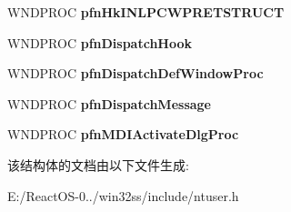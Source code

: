 \begin{DoxyCompactItemize}
W\+N\+D\+P\+R\+OC {\bfseries pfn\+Hk\+I\+N\+L\+P\+C\+W\+P\+R\+E\+T\+S\+T\+R\+U\+CT}
\item 
\mbox{\label{struct___p_f_n_c_l_i_e_n_t_acfe5e7981d188c955f4c09ba75c6a039}} 
W\+N\+D\+P\+R\+OC {\bfseries pfn\+Dispatch\+Hook}
\item 
\mbox{\label{struct___p_f_n_c_l_i_e_n_t_a069c0e8bcd86baec9be90a88561ae6b5}} 
W\+N\+D\+P\+R\+OC {\bfseries pfn\+Dispatch\+Def\+Window\+Proc}
\item 
\mbox{\label{struct___p_f_n_c_l_i_e_n_t_a0f3dbb55a8a141924ea423c855fa58f9}} 
W\+N\+D\+P\+R\+OC {\bfseries pfn\+Dispatch\+Message}
\item 
\mbox{\label{struct___p_f_n_c_l_i_e_n_t_a3da654c88ed0ddfdcedaf468f3b56dc5}} 
W\+N\+D\+P\+R\+OC {\bfseries pfn\+M\+D\+I\+Activate\+Dlg\+Proc}
\end{DoxyCompactItemize}


该结构体的文档由以下文件生成\+:\begin{DoxyCompactItemize}
\item 
E\+:/\+React\+O\+S-\/0../win32ss/include/ntuser.\+h\end{DoxyCompactItemize}

